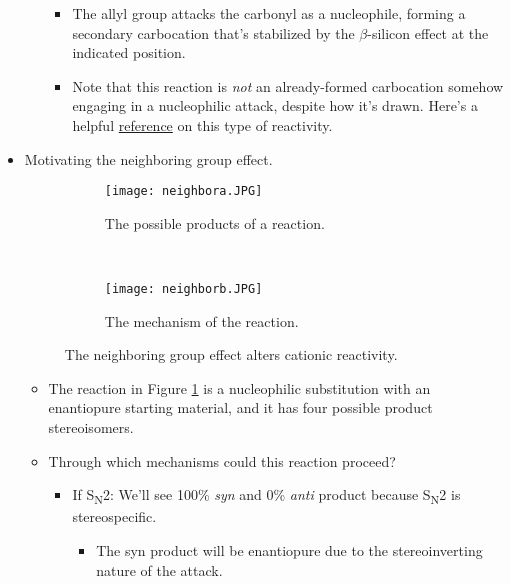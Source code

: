 \documentclass[../notes.tex]{subfiles}
\begin{document}
\begin{itemize}
\begin{itemize}
\begin{itemize}
            \item The allyl group attacks the carbonyl as a nucleophile, forming a secondary carbocation that's stabilized by the $\beta$-silicon effect at the indicated position.
            \item Note that this reaction is \emph{not} an already-formed carbocation somehow engaging in a nucleophilic attack, despite how it's drawn. Here's a helpful \href{https://www.uwindsor.ca/people/jgreen/sites/uwindsor.ca.people.jgreen/files/41-45.pdf}{reference} on this type of reactivity.
        \end{itemize}
    \end{itemize}
    \item Motivating the neighboring group effect.
    \begin{figure}[H]
        \centering
        \begin{subfigure}[b]{\linewidth}
            \centering
            \texttt{[image: neighbora.JPG]}
            \caption{The possible products of a reaction.}
            \label{fig:neighbora}
        \end{subfigure}\\[2em]
        \begin{subfigure}[b]{\linewidth}
            \centering
            \texttt{[image: neighborb.JPG]}
            \caption{The mechanism of the reaction.}
            \label{fig:neighborb}
        \end{subfigure}
        \caption{The neighboring group effect alters cationic reactivity.}
        \label{fig:neighbor}
    \end{figure}
    \begin{itemize}
        \item The reaction in Figure \ref{fig:neighbora} is a nucleophilic substitution with an enantiopure starting material, and it has four possible product stereoisomers.
        \item Through which mechanisms could this reaction proceed?
        \begin{itemize}
            \item If S\textsubscript{N}2: We'll see 100\% \emph{syn} and 0\% \emph{anti} product because S\textsubscript{N}2 is stereospecific.
            \begin{itemize}
                \item The syn product will be enantiopure due to the stereoinverting nature of the attack.
            \end{itemize}

\end{itemize}
\end{itemize}
\end{itemize}
\end{document}
